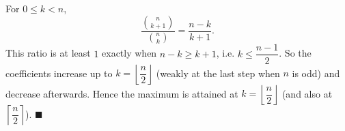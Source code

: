 For $0\le k<n$,
\[\dfrac{\binom n{k+1}}{\binom nk}=\dfrac{n-k}{k+1}.\]
This ratio is at least $1$ exactly when $n-k\ge k+1$, i.e. $k\le\dfrac{n-1}2$. So the coefficients increase up to $k=\left\lfloor\dfrac n2\right\rfloor$ (weakly at the last step when $n$ is odd) and decrease afterwards. Hence the maximum is attained at $k=\left\lfloor\dfrac n2\right\rfloor$ (and also at $\left\lceil\dfrac n2\right\rceil$). $\blacksquare$
